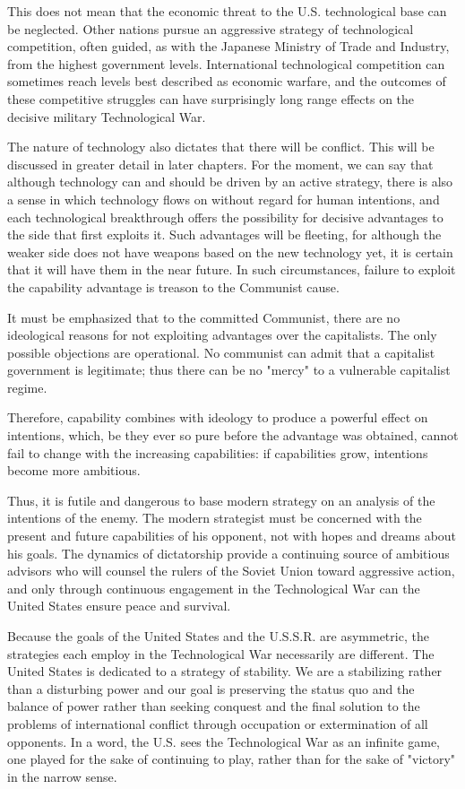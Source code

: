 \documentclass[a4paper,12pt]{book}
\begin{document}
This does not mean that the economic threat to the U.S. technological base can be neglected. Other nations pursue an aggressive strategy of technological competition, often guided, as with the Japanese Ministry of Trade and Industry, from the highest government levels. International technological competition can sometimes reach levels best described as economic warfare, and the outcomes of these competitive struggles can have surprisingly long range effects on the decisive military Technological War.

The nature of technology also dictates that there will be conflict. This will be discussed in greater detail in later chapters. For the moment, we can say that although technology can and should be driven by an active strategy, there is also a sense in which technology flows on without regard for human intentions, and each technological breakthrough offers the possibility for decisive advantages to the side that first exploits it. Such advantages will be fleeting, for although the weaker side does not have weapons based on the new technology yet, it is certain that it will have them in the near future. In such circumstances, failure to exploit the capability advantage is treason to the Communist cause.

It must be emphasized that to the committed Communist, there are no ideological reasons for not exploiting advantages over the capitalists. The only possible objections are operational. No communist can admit that a capitalist government is legitimate; thus there can be no "mercy" to a vulnerable capitalist regime.

Therefore, capability combines with ideology to produce a powerful effect on intentions, which, be they ever so pure before the advantage was obtained, cannot fail to change with the increasing capabilities: if capabilities grow, intentions become more ambitious.

Thus, it is futile and dangerous to base modern strategy on an analysis of the intentions of the enemy. The modern strategist must be concerned with the present and future capabilities of his opponent, not with hopes and dreams about his goals. The dynamics of dictatorship provide a continuing source of ambitious advisors who will counsel the rulers of the Soviet Union toward aggressive action, and only through continuous engagement in the Technological War can the United States ensure peace and survival.

Because the goals of the United States and the U.S.S.R. are asymmetric, the strategies each employ in the Technological War necessarily are different. The United States is dedicated to a strategy of stability. We are a stabilizing rather than a disturbing power and our goal is preserving the status quo and the balance of power rather than seeking conquest and the final solution to the problems of international conflict through occupation or extermination of all opponents. In a word, the U.S. sees the Technological War as an infinite game, one played for the sake of continuing to play, rather than for the sake of "victory" in the narrow sense.
\end{document}
